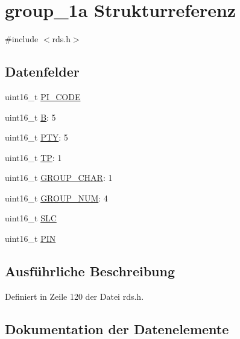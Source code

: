 \hypertarget{structgroup__1a}{}\section{group\+\_\+1a Strukturreferenz}
\label{structgroup__1a}


{\ttfamily \#include $<$rds.\+h$>$}

\subsection*{Datenfelder}
\begin{DoxyCompactItemize}
\item 
uint16\+\_\+t \hyperlink{structgroup__1a_a5cd9b1f6413028425796c1129aa8fd87}{P\+I\+\_\+\+C\+O\+D\+E}
\item 
uint16\+\_\+t \hyperlink{structgroup__1a_ae783bd90764c8455228772c025c064e4}{B}\+: 5
\item 
uint16\+\_\+t \hyperlink{structgroup__1a_a0474967478fbbc2c71b800d2e0132d45}{P\+T\+Y}\+: 5
\item 
uint16\+\_\+t \hyperlink{structgroup__1a_ab9e634c63b0d95a96716d5f6d7f06d72}{T\+P}\+: 1
\item 
uint16\+\_\+t \hyperlink{structgroup__1a_a66d4119990dc4c3e040a43885e9bb953}{G\+R\+O\+U\+P\+\_\+\+C\+H\+A\+R}\+: 1
\item 
uint16\+\_\+t \hyperlink{structgroup__1a_a9f692e9f76ee88348d426bcd4e9bc70b}{G\+R\+O\+U\+P\+\_\+\+N\+U\+M}\+: 4
\item 
uint16\+\_\+t \hyperlink{structgroup__1a_adeb94d897f554bdd08433c17155c53d2}{S\+L\+C}
\item 
uint16\+\_\+t \hyperlink{structgroup__1a_a23b9db30b873d9b45f435df66328a784}{P\+I\+N}
\end{DoxyCompactItemize}


\subsection{Ausführliche Beschreibung}


Definiert in Zeile 120 der Datei rds.\+h.



\subsection{Dokumentation der Datenelemente}
\hypertarget{structgroup__1a_ae783bd90764c8455228772c025c064e4}{}
